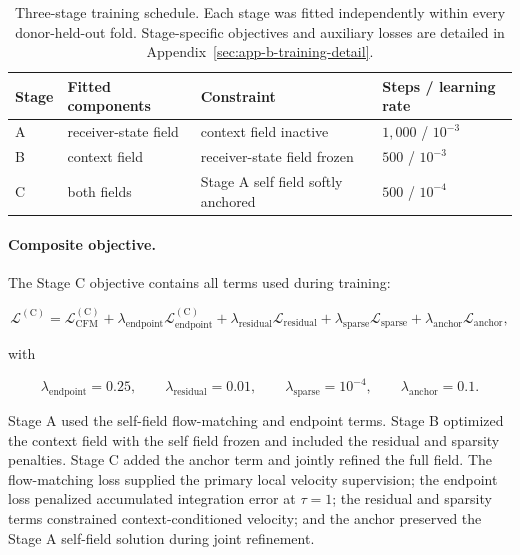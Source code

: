 \begin{table}[htbp]
\centering
\caption[Three-stage training schedule]{Three-stage training schedule. Each
stage was fitted independently within every donor-held-out fold. Stage-specific
objectives and auxiliary losses are detailed in
Appendix~\ref{sec:app-b-training-detail}.}
\label{tab:training-schedule}
\small
\begin{tabular}{llll}
\toprule
Stage & Fitted components & Constraint & Steps / learning rate \\
\midrule
A & receiver-state field & context field inactive
  & \(1{,}000\) / \(10^{-3}\) \\
B & context field & receiver-state field frozen
  & \(500\) / \(10^{-3}\) \\
C & both fields & Stage A self field softly anchored
  & \(500\) / \(10^{-4}\) \\
\bottomrule
\end{tabular}
\end{table}

\paragraph{Composite objective.}
The Stage C objective contains all terms used during training:

\begin{equation}
\mathcal{L}^{(\mathrm{C})}
=
\mathcal{L}_{\mathrm{CFM}}^{(\mathrm{C})}
+
\lambda_{\mathrm{endpoint}}
\mathcal{L}_{\mathrm{endpoint}}^{(\mathrm{C})}
+
\lambda_{\mathrm{residual}}
\mathcal{L}_{\mathrm{residual}}
+
\lambda_{\mathrm{sparse}}
\mathcal{L}_{\mathrm{sparse}}
+
\lambda_{\mathrm{anchor}}
\mathcal{L}_{\mathrm{anchor}},
\label{eq:methods-stage-c-objective}
\end{equation}

with

\begin{equation}
\lambda_{\mathrm{endpoint}}=0.25,
\qquad
\lambda_{\mathrm{residual}}=0.01,
\qquad
\lambda_{\mathrm{sparse}}=10^{-4},
\qquad
\lambda_{\mathrm{anchor}}=0.1.
\label{eq:methods-training-loss-weights}
\end{equation}

Stage A used the self-field flow-matching and endpoint terms. Stage B optimized
the context field with the self field frozen and included the residual and
sparsity penalties. Stage C added the anchor term and jointly refined the full
field. The flow-matching loss supplied the primary local velocity supervision;
the endpoint loss penalized accumulated integration error at \(\tau=1\); the
residual and sparsity terms constrained context-conditioned velocity; and the
anchor preserved the Stage A self-field solution during joint refinement.

